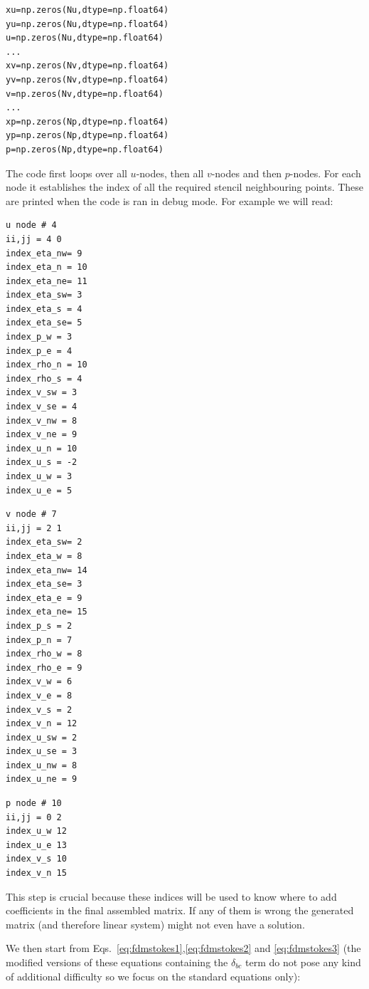 \begin{lstlisting}
xu=np.zeros(Nu,dtype=np.float64)
yu=np.zeros(Nu,dtype=np.float64)
u=np.zeros(Nu,dtype=np.float64)
...
xv=np.zeros(Nv,dtype=np.float64)
yv=np.zeros(Nv,dtype=np.float64)
v=np.zeros(Nv,dtype=np.float64)
...
xp=np.zeros(Np,dtype=np.float64)
yp=np.zeros(Np,dtype=np.float64)
p=np.zeros(Np,dtype=np.float64)
\end{lstlisting}

The code first loops over all $u$-nodes, then all $v$-nodes
and then $p$-nodes. For each node it establishes the index
of all the required stencil neighbouring points.
These are printed when the code is ran in debug mode.
For example we will read:


\begin{multicols}{3}

\begin{verbatim}
u node # 4
ii,jj = 4 0
index_eta_nw= 9
index_eta_n = 10
index_eta_ne= 11
index_eta_sw= 3
index_eta_s = 4
index_eta_se= 5
index_p_w = 3
index_p_e = 4
index_rho_n = 10
index_rho_s = 4
index_v_sw = 3
index_v_se = 4
index_v_nw = 8
index_v_ne = 9
index_u_n = 10
index_u_s = -2
index_u_w = 3
index_u_e = 5
\end{verbatim}
\columnbreak
\begin{verbatim}
v node # 7
ii,jj = 2 1
index_eta_sw= 2
index_eta_w = 8
index_eta_nw= 14
index_eta_se= 3
index_eta_e = 9
index_eta_ne= 15
index_p_s = 2
index_p_n = 7
index_rho_w = 8
index_rho_e = 9
index_v_w = 6
index_v_e = 8
index_v_s = 2
index_v_n = 12
index_u_sw = 2
index_u_se = 3
index_u_nw = 8
index_u_ne = 9
\end{verbatim}
\columnbreak

\begin{verbatim}
p node # 10
ii,jj = 0 2
index_u_w 12
index_u_e 13
index_v_s 10
index_v_n 15
\end{verbatim}

\end{multicols}

This step is crucial because these indices will be used to know
where to add coefficients in the final assembled matrix. 
If any of them is wrong the generated matrix (and therefore linear system)
might not even have a solution. 


We then start from Eqs.~\eqref{eq:fdmstokes1},\eqref{eq:fdmstokes2} and \eqref{eq:fdmstokes3} 
(the modified versions of these equations containing the $\delta_{bc}$ term do not pose
any kind of additional difficulty so we focus on the standard equations only):


